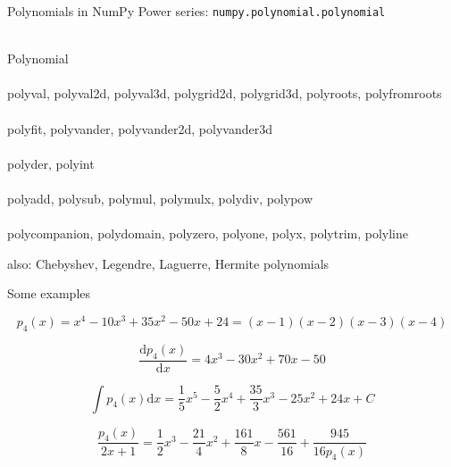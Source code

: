 \documentclass[svgnames]{beamer}
\begin{document}
\begin{frame}{Polynomials in NumPy}
 Power series: \texttt{numpy.polynomial.polynomial}

 \vspace{0.2truecm}
 \\
 \small{Polynomial}\\[0.1truecm]
 \\
 \small{polyval, polyval2d, polyval3d, polygrid2d, polygrid3d, polyroots,
        polyfromroots}\\[0.1truecm]
 \\
 \small{polyfit, polyvander, polyvander2d, polyvander3d}\\[0.1truecm]
 \\
 \small{polyder, polyint}\\[0.1truecm]
 \\
 \small{polyadd, polysub, polymul, polymulx, polydiv, polypow}\\[0.1truecm]
 \\
 \small{polycompanion, polydomain, polyzero, polyone, polyx, polytrim, polyline}

 \vspace{0.2truecm}
 \small{also: Chebyshev, Legendre, Laguerre, Hermite polynomials}
\end{frame}

\begin{frame}{Some examples}
 \begin{small}
  \begin{displaymath}
   p_4(x) = x^4-10x^3+35x^2-50x+24 = (x-1)(x-2)(x-3)(x-4)
  \end{displaymath}

  \begin{displaymath}
   \frac{\text{d}p_4(x)}{\text{d}x} = 4x^3-30x^2+70x-50
  \end{displaymath}

  \begin{displaymath}
   \int p_4(x)\text{d}x = \frac{1}{5}x^5-\frac{5}{2}x^4+\frac{35}{3}x^3
                          -25x^2+24x+C
  \end{displaymath}

  \begin{displaymath}
   \frac{p_4(x)}{2x+1} = \frac{1}{2}x^3-\frac{21}{4}x^2+\frac{161}{8}x-\frac{561}{16}
   +\frac{945}{16p_4(x)}
  \end{displaymath}
 \end{small}
\end{frame}
\end{document}
